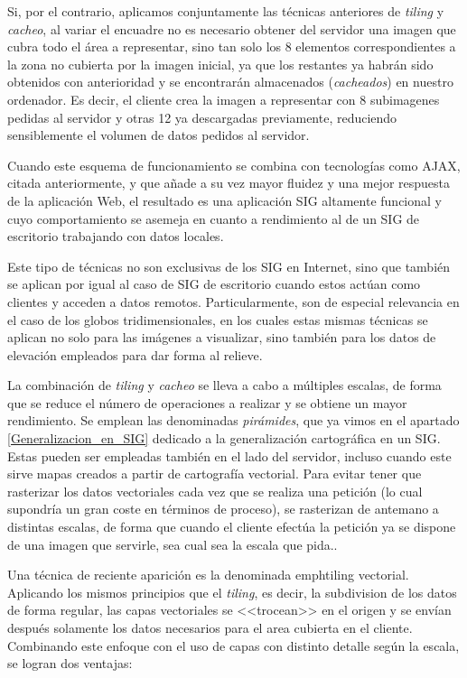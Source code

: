 Si, por el contrario, aplicamos conjuntamente las técnicas anteriores de \emph{tiling} y \emph{cacheo}, al variar el encuadre no es necesario obtener del servidor una imagen que cubra todo el área a representar, sino tan solo los 8 elementos correspondientes a la zona no cubierta por la imagen inicial, ya que los restantes ya habrán sido obtenidos con anterioridad y se encontrarán almacenados (\emph{cacheados}) en nuestro ordenador. Es decir, el cliente crea la imagen a representar con 8 subimagenes pedidas al servidor y otras 12 ya descargadas previamente, reduciendo sensiblemente el volumen de datos pedidos al servidor.

Cuando este esquema de funcionamiento se combina con tecnologías como AJAX, citada anteriormente, y que añade a su vez mayor fluidez y una mejor respuesta de la aplicación Web, el resultado es una aplicación SIG altamente funcional y cuyo comportamiento se asemeja en cuanto a rendimiento al de un SIG de escritorio trabajando con datos locales.

Este tipo de técnicas no son exclusivas de los SIG en Internet, sino que también se aplican por igual al caso de SIG de escritorio cuando estos actúan como clientes y acceden a datos remotos. Particularmente, son de especial relevancia en el caso de los globos tridimensionales, en los cuales estas mismas técnicas se aplican no solo para las imágenes a visualizar, sino también para los datos de elevación empleados para dar forma al relieve.

La combinación de \emph{tiling} y \emph{cacheo} se lleva a cabo a múltiples escalas, de forma que se reduce el número de operaciones a realizar y se obtiene un mayor rendimiento. Se emplean las denominadas \emph{pirámides}, que ya vimos en el apartado \ref{Generalizacion_en_SIG} dedicado a la generalización cartográfica en un SIG. Estas pueden ser empleadas también en el lado del servidor, incluso cuando este sirve mapas creados a partir de cartografía vectorial. Para evitar tener que rasterizar los datos vectoriales cada vez que se realiza una petición (lo cual supondría un gran coste en términos de proceso), se rasterizan de antemano a distintas escalas, de forma que cuando el cliente efectúa la petición ya se dispone de una imagen que servirle, sea cual sea la escala que pida..

Una técnica de reciente aparición es la denominada emph{tiling vectorial}. Aplicando los mismos principios que el \emph{tiling}, es decir, la subdivision de los datos de forma regular, las capas vectoriales se <<trocean>> en el origen y se envían después solamente los datos necesarios para el area cubierta en el cliente. Combinando este enfoque con el uso de capas con distinto detalle según la escala, se logran dos ventajas: 

